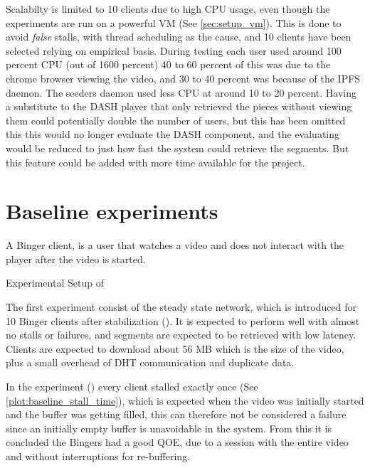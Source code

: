 Scalabilty is limited to 10 clients due to high CPU usage, even though the experiments are run on a powerful \ac{VM} (See \autoref{sec:setup_vm}). This is done to avoid \textit{false} stalls, with thread scheduling as the cause, and 10 clients have been selected relying on empirical basis. During testing each user used around 100 percent CPU (out of 1600 percent) 40 to 60 percent of this was due to the chrome browser viewing the video, and 30 to 40 percent was because of the \ac{IPFS} daemon. The seeders daemon used less CPU at around 10 to 20 percent. Having a substitute to the \ac{DASH} player that only retrieved the pieces without viewing them could potentially double the number of users, but this has been omitted this this would no longer evaluate the \ac{DASH} component, and the evaluating would be reduced to just how fast the system could retrieve the segments. But this feature could be added with more time available for the project.

\section{Baseline experiments}
\label{sec:eval_baseline}
A Binger client, is a user that watches a video and does not interact with the player after the video is started.

\begin{table}[!htbp]
    \myfloatalign
    \caption[Experimental Setup of Baseline]{Experimental Setup of }
    \label{tab:exp_overview_baseline}
    
\end{table}

The first experiment consist of the steady state network, which is introduced for 10 Binger clients after stabilization (). It is expected to perform well with almost no stalls or failures, and segments are expected to be retrieved with low latency. Clients are expected to download about 56 \ac{MB} which is the size of the video, plus a small overhead of \ac{DHT} communication and duplicate data.

In the experiment () every client stalled exactly once (See \autoref{plot:baseline_stall_time}), which is expected when the video was initially started and the buffer was getting filled, this can therefore not be considered a failure since an initially empty buffer is unavoidable in the system. From this it is concluded the Bingers had a good \ac{QOE}, due to a session with the entire video and without interruptions for re-buffering.

